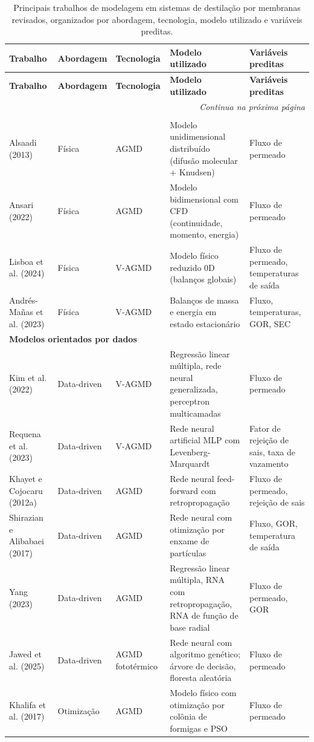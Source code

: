 \begin{longtable}{p{3.2cm} p{1.8cm} p{1.8cm} p{3.8cm} p{3.8cm}}
\caption[Principais trabalhos de modelagem em MD revisados]{Principais trabalhos de modelagem em sistemas de destilação por membranas revisados, organizados por abordagem, tecnologia, modelo utilizado e variáveis preditas.}
\label{tab:principais_trabalhos_md}\\
\toprule
\textbf{Trabalho} & \textbf{Abordagem} & \textbf{Tecnologia} & \textbf{Modelo utilizado} & \textbf{Variáveis preditas} \\
\midrule
\endfirsthead
\toprule
\textbf{Trabalho} & \textbf{Abordagem} & \textbf{Tecnologia} & \textbf{Modelo utilizado} & \textbf{Variáveis preditas} \\
\midrule
\endhead
\multicolumn{5}{r}{\textit{Continua na próxima página}} \\
\endfoot
\bottomrule
\endlastfoot

\multicolumn{5}{l}{\textbf{Modelos físicos (primeiros princípios)}} \\
Alsaadi (2013) & Física & AGMD & Modelo unidimensional distribuído (difusão molecular + Knudsen) & Fluxo de permeado \\
Ansari (2022) & Física & AGMD & Modelo bidimensional com CFD (continuidade, momento, energia) & Fluxo de permeado \\
Lisboa et al. (2024) & Física & V-AGMD & Modelo físico reduzido 0D (balanços globais) & Fluxo de permeado, temperaturas de saída \\
Andrés-Mañas et al. (2023) & Física & V-AGMD & Balanços de massa e energia em estado estacionário & Fluxo, temperaturas, GOR, SEC \\
\midrule

\multicolumn{5}{l}{\textbf{Modelos orientados por dados}} \\
Kim et al. (2022) & Data-driven & V-AGMD & Regressão linear múltipla, rede neural generalizada, perceptron multicamadas & Fluxo de permeado \\
Requena et al. (2023) & Data-driven & V-AGMD & Rede neural artificial MLP com Levenberg-Marquardt & Fator de rejeição de sais, taxa de vazamento \\
Khayet e Cojocaru (2012a) & Data-driven & AGMD & Rede neural feed-forward com retropropagação & Fluxo de permeado, rejeição de sais \\
Shirazian e Alibabaei (2017) & Data-driven & AGMD & Rede neural com otimização por enxame de partículas & Fluxo, GOR, temperatura de saída \\
Yang (2023) & Data-driven & AGMD & Regressão linear múltipla, RNA com retropropagação, RNA de função de base radial & Fluxo de permeado, GOR \\
Jawed et al. (2025) & Data-driven & AGMD fototérmico & Rede neural com algoritmo genético; árvore de decisão, floresta aleatória & Fluxo de permeado \\
Khalifa et al. (2017) & Otimização & AGMD & Modelo físico com otimização por colônia de formigas e PSO & Fluxo de permeado \\
\midrule


\end{longtable}
